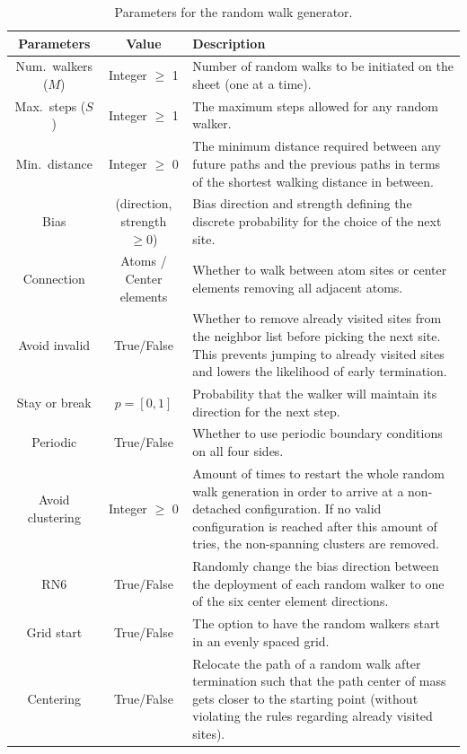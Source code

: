 \begin{table}[h]
  \begin{center}
  \caption{Parameters for the random walk generator.}
  \label{tab:RW_params}
  \begin{tabular}{ | c | c | m{8cm} |} \hline
  \textbf{Parameters} & \textbf{Value} & \textbf{Description}  \\ \hline
  Num.\ walkers ($M$) & Integer $\ge$ 1 & Number of random walks to be initiated on the sheet (one at a time). \\ \hline
  Max.\ steps ($S$)  & Integer $\ge$ 1 &The maximum steps allowed for any random walker. \\ \hline
  Min.\ distance  & Integer $\ge$ 0 &The minimum distance required between any future paths and the previous paths in terms of the shortest walking distance in between. \\ \hline
  Bias  & (direction, strength $\ge0$) & Bias direction and strength defining the discrete probability for the choice of the next site. \\ \hline
  Connection  & Atoms / Center elements & Whether to walk between atom sites or center elements removing all adjacent atoms. \\ \hline
  Avoid invalid  & True/False & Whether to remove already visited sites from the neighbor list before picking the next site. This prevents jumping to already visited sites and lowers the likelihood of early termination.  \\ \hline
  Stay or break  & $p = [0,1]$ & Probability that the walker will maintain its direction for the next step. \\ \hline
  Periodic  & True/False & Whether to use periodic boundary conditions on all four sides. \\ \hline
  Avoid clustering  & Integer $\ge$ 0 & Amount of times to restart the whole random walk generation in order to arrive at a non-detached configuration. If no valid configuration is reached after this amount of tries, the non-spanning clusters are removed.\\ \hline
  RN6  & True/False & Randomly change the bias direction between the deployment of each random walker to one of the six center element directions. \\ \hline
  Grid start  & True/False & The option to have the random walkers start in an evenly spaced grid. \\ \hline
  Centering  & True/False & Relocate the path of a random walk after termination such that the path center of mass gets closer to the starting point (without violating the rules regarding already visited sites).\\ \hline
  \end{tabular}
  \end{center}
\end{table}

